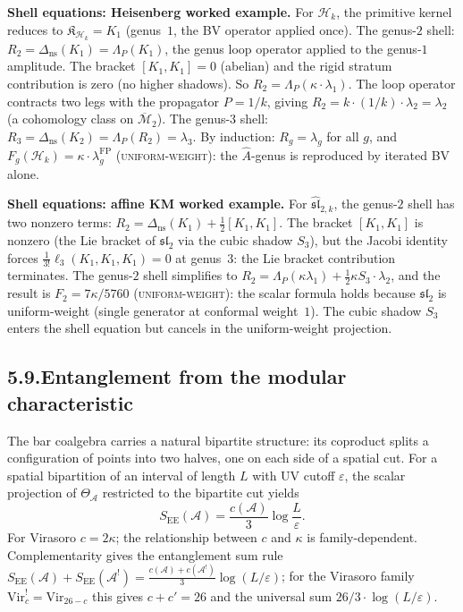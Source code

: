 \documentclass[11pt,reqno]{amsart}
\theoremstyle{definition}
\theoremstyle{remark}
\providecommand{\cA}{\mathcal{A}}
\providecommand{\cH}{\mathcal{H}}
\providecommand{\cM}{\mathcal{M}}
\providecommand{\fsl}{\mathfrak{sl}}
\numberwithin{equation}{section}
\begin{document}
\medskip
\noindent\textbf{Shell equations: Heisenberg worked example.}\enspace
For $\cH_k$, the primitive kernel reduces to $\mathfrak K_{\cH_k}=K_1$
(genus~$1$, the BV operator applied once). The genus-$2$ shell:
$R_2=\Delta_{\mathrm{ns}}(K_1)=\Lambda_P(K_1)$, the genus loop
operator applied to the genus-$1$ amplitude. The bracket
$[K_1,K_1]=0$ (abelian) and the rigid stratum contribution is zero
(no higher shadows). So $R_2=\Lambda_P(\kappa\cdot\lambda_1)$.
The loop operator contracts two legs with the propagator $P=1/k$,
giving $R_2=k\cdot(1/k)\cdot\lambda_2=\lambda_2$ (a cohomology class
on $\overline{\cM}_2$). The genus-$3$ shell:
$R_3=\Delta_{\mathrm{ns}}(K_2)=\Lambda_P(R_2)=\lambda_3$. By
induction: $R_g=\lambda_g$ for all $g$, and
$F_g(\cH_k)=\kappa\cdot\lambda_g^{\mathrm{FP}}$
\textsc{(uniform-weight)}: the $\hat A$-genus is reproduced by
iterated BV alone.

\medskip
\noindent\textbf{Shell equations: affine KM worked example.}\enspace
For $\widehat{\fsl}_{2,k}$, the genus-$2$ shell has two nonzero
terms: $R_2=\Delta_{\mathrm{ns}}(K_1)+\tfrac12[K_1,K_1]$. The
bracket $[K_1,K_1]$ is nonzero (the Lie bracket of $\fsl_2$ via the
cubic shadow $S_3$), but the Jacobi identity forces
$\tfrac{1}{3!}\ell_3(K_1,K_1,K_1)=0$ at genus~$3$: the Lie bracket
contribution terminates. The genus-$2$ shell simplifies to
$R_2=\Lambda_P(\kappa\lambda_1)+\tfrac12\kappa S_3\cdot\lambda_2$,
and the result is $F_2=7\kappa/5760$ \textsc{(uniform-weight)}: the
scalar formula holds because $\fsl_2$ is uniform-weight (single
generator at conformal weight~$1$). The cubic shadow $S_3$ enters
the shell equation but cancels in the uniform-weight projection.

\subsection*{5.9.\enspace Entanglement from the modular characteristic}

The bar coalgebra carries a natural bipartite structure: its coproduct
splits a configuration of points into two halves, one on each side of
a spatial cut. For a spatial bipartition of an interval of length $L$
with UV cutoff $\varepsilon$, the scalar projection of $\Theta_\cA$
restricted to the bipartite cut yields
\[
S_{\mathrm{EE}}(\cA)=\frac{c(\cA)}{3}\log\frac{L}{\varepsilon}.
\]
For Virasoro $c=2\kappa$; the relationship between $c$ and $\kappa$
is family-dependent. Complementarity gives the entanglement sum rule
$S_{\mathrm{EE}}(\cA)+S_{\mathrm{EE}}(\cA^!)=\tfrac{c(\cA)+c(\cA^!)}{3}\log(L/\varepsilon)$;
for the Virasoro family $\mathrm{Vir}_c^!=\mathrm{Vir}_{26-c}$ this
gives $c+c'=26$ and the universal sum $26/3\cdot\log(L/\varepsilon)$.
\end{document}
